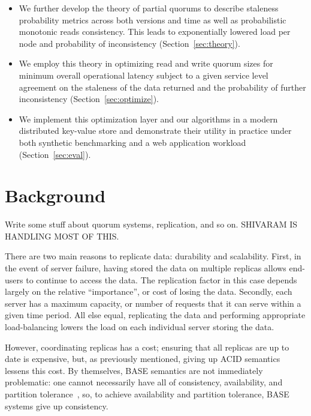 \documentclass{vldb}
\begin{document}
\begin{itemize}

\item We further develop the theory of partial quorums to describe
  staleness probability metrics across both versions and time as well
  as probabilistic monotonic reads consistency.  This leads to
  exponentially lowered load per node and probability of
  inconsistency (Section~\ref{sec:theory}).

\item We employ this theory in optimizing read and write quorum sizes
  for minimum overall operational latency subject to a given
  service level agreement on the staleness of the data returned and
  the probability of further inconsistency (Section~\ref{sec:optimize}).

\item We implement this optimization layer and our algorithms in a
  modern distributed key-value store and demonstrate their utility in
  practice under both synthetic benchmarking and a web application
  workload (Section~\ref{sec:eval}).

\end{itemize}

\section{Background}

Write some stuff about quorum systems, replication, and so on.
SHIVARAM IS HANDLING MOST OF THIS.


There are two main reasons to replicate data: durability and
scalability.  First, in the event of server failure, having stored the
data on multiple replicas allows end-users to continue to access the
data.  The replication factor in this case depends largely on the
relative ``importance'', or cost of losing the data.  Secondly, each
server has a maximum capacity, or number of requests that it can serve within a
given time period.  All else equal, replicating the data and
performing appropriate load-balancing lowers the load on each
individual server storing the data.

However, coordinating replicas has a cost; ensuring that all replicas
are up to date is expensive, but, as previously mentioned, giving up
ACID semantics lessens this cost.  By themselves, BASE semantics are
not immediately problematic: one cannot necessarily have all of
consistency, availability, and partition tolerance~\cite{cap-proof},
so, to achieve availability and partition tolerance, BASE systems give
up consistency.
\end{document}
